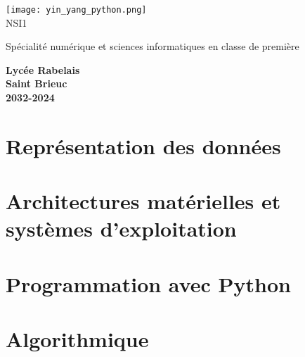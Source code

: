 \documentclass[10pt,a4paper]{nsibook}
\begin{document}
\begin{titlepage}
    \begin{center}
        \texttt{[image: yin\_yang\_python.png]}\\[2em]

        {\bigtitlefont \LARGE\color{gray} NSI1\\}

        {\titlefont\Large\color{gray} Spécialité numérique et sciences informatiques en classe de première\\[2em]}

        {\color{gray}\textbf{Lycée Rabelais\\ Saint Brieuc\\ 2032-2024}}
    \end{center}
\end{titlepage}
\part{Représentation des données}





\part{Architectures matérielles et \\systèmes d'exploitation}



\part{Programmation avec Python}




\part{Algorithmique}



\tableofcontents
\end{document}

